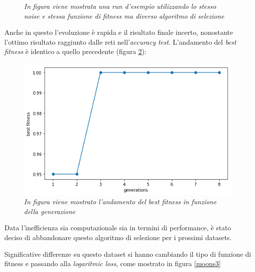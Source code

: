 \documentclass[12pt,a4paper]{report}
\begin{document}
\begin{figure}[H]
 \caption{\textit{In figura viene mostrata una run d'esempio utilizzando lo stesso noise e stessa funzione di fitness ma diverso algoritmo di selezione}}
 \label{moons2}
\end{figure}

Anche in questo l'evoluzione è rapida e il risultato finale incerto, nonostante l'ottimo risultato raggiunto dalle reti nell'\textit{accuracy test}. L'andamento del \textit{best fitness} è identico a quello precedente (figura \ref{best2}):

\begin{figure}[H]
 \centering
 \includegraphics[scale = 0.4]{images/moons-sons-acc./best}
 \caption{\textit{In figura viene mostrato l'andamento del best fitness in funzione della generazione}}
 \label{best2}
\end{figure}

Data l'inefficienza sia computazionale sia in termini di performance, è stato deciso di abbandonare questo algoritmo di selezione per i prossimi datasets.


Significative differenze su questo dataset si hanno cambiando il tipo di funzione di fitness e passando alla \textit{logaritmic loss}, come mostrato in figura \ref{moons3}
\end{document}
